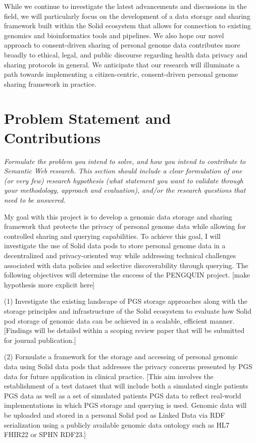 \documentclass{article}
\begin{document}
While we continue to investigate the latest advancements and discussions in the field, we will particularly focus on the development of a data storage and sharing framework built within the Solid ecosystem that allows for connection to existing genomics and bioinformatics tools and pipelines. We also hope our novel approach to consent-driven sharing of personal genome data contributes more broadly to ethical, legal, and public discourse regarding health data privacy and sharing protocols in general. We anticipate that our research will illuminate a path towards implementing a citizen-centric, consent-driven personal genome sharing framework in practice.

\section{Problem Statement and Contributions}
\textit{Formulate the problem you intend to solve, and how you intend to contribute to Semantic Web research. This section should include a clear formulation of one (or very few) research hypothesis (what statement you want to validate through your methodology, approach and evaluation), and/or the research questions that need to be answered.}

My goal with this project is to develop a genomic data storage and sharing framework that protects the privacy of personal genome data while allowing for controlled sharing and querying capabilities. To achieve this goal, I will investigate the use of Solid data pods to store personal genome data in a decentralized and privacy-oriented way while addressing technical challenges associated with data policies and selective discoverability through querying. The following objectives will determine the success of the PENGQUIN project.
[make hypothesis more explicit here]

(1) Investigate the existing landscape of PGS storage approaches along with the storage principles and infrastructure of the Solid ecosystem to evaluate how Solid pod storage of genomic data can be achieved in a scalable, efficient manner. [Findings will be detailed within a scoping review paper that will be submitted for journal publication.]

(2) Formulate a framework for the storage and accessing of personal genomic data using Solid data pods that addresses the privacy concerns presented by PGS data for future application in clinical practice. [This aim involves the establishment of a test dataset that will include both a simulated single patient\textquotesingle s PGS data as well as a set of simulated patient\textquotesingle s PGS data to reflect real-world implementations in which PGS storage and querying is used. Genomic data will be uploaded and stored in a personal Solid pod as Linked Data via RDF serialization using a publicly available genomic data ontology such as HL7 FHIR22 or SPHN RDF23.]
\end{document}
